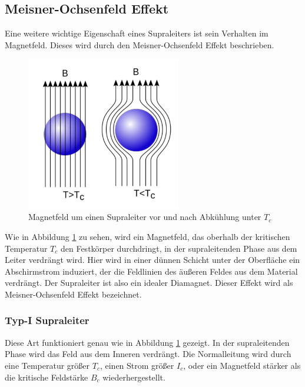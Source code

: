 	\subsection{Meisner-Ochsenfeld Effekt}
Eine weitere wichtige Eigenschaft eines Supraleiters ist sein Verhalten im 
Magnetfeld. Dieses wird durch den Meisner-Ochsenfeld Effekt beschrieben.
\begin{figure}[h]
	\centering
	\includegraphics[width=0.6\textwidth]{Abb/meisner.pdf}
	\caption{Magnetfeld um einen Supraleiter vor und nach Abkühlung unter $T_c$}
	\label{Abb:meisner}
\end{figure}
Wie in Abbildung \ref{Abb:meisner} zu sehen, wird ein Magnetfeld, das oberhalb der
kritischen Temperatur $T_c$ den Festkörper durchdringt, in der supraleitenden Phase
aus dem Leiter verdrängt wird. Hier wird in einer dünnen Schicht unter der 
Oberfläche ein Abschirmstrom induziert, der die Feldlinien des äußeren Feldes aus
dem Material verdrängt. Der Supraleiter ist also ein idealer Diamagnet. Dieser 
Effekt wird als Meisner-Ochsenfeld Effekt bezeichnet.

		\subsubsection{Typ-I Supraleiter}
Diese Art funktioniert genau wie in Abbildung \ref{Abb:meisner} gezeigt. In der 
supraleitenden Phase wird das Feld aus dem Inneren verdrängt. Die Normalleitung 
wird durch eine Temperatur größer $T_c$, einen Strom größer $I_c$, oder ein
Magnetfeld stärker als die kritische Feldstärke $B_c$ wiederhergestellt. 

